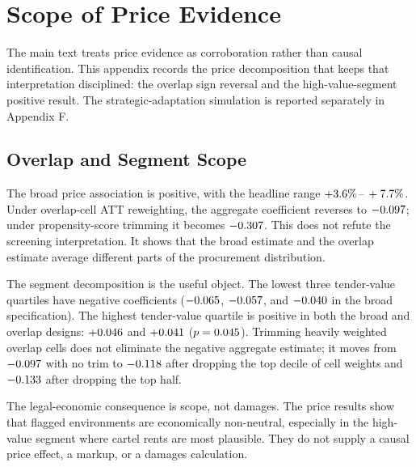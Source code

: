 \section{Scope of Price Evidence}
\label{app:scope_adaptation_submission}

The main text treats price evidence as corroboration rather
than causal identification. This appendix records the price
decomposition that keeps that interpretation disciplined: the
overlap sign reversal and the high-value-segment positive
result. The strategic-adaptation simulation is reported
separately in Appendix F.

\subsection{Overlap and Segment Scope}
\label{app:overlap_scope_submission}

The broad price association is positive, with the headline range
$+3.6\%\,\text{--}\,+7.7\%$. Under overlap-cell ATT reweighting, the
aggregate coefficient reverses to $-0.097$; under
propensity-score trimming it becomes $-0.307$. This
does not refute the screening interpretation. It shows that the
broad estimate and the overlap estimate average different parts
of the procurement distribution.

The segment decomposition is the useful object. The lowest three
tender-value quartiles have negative coefficients
($-0.065$, $-0.057$, and
$-0.040$ in the broad specification). The highest
tender-value quartile is positive in both the broad and overlap
designs: $+0.046$ and $+0.041$
($p=0.045$). Trimming heavily weighted overlap cells
does not eliminate the negative aggregate estimate; it moves from
$-0.097$ with no trim to $-0.118$ after dropping
the top decile of cell weights and $-0.133$ after
dropping the top half.

The legal-economic consequence is scope, not damages. The price
results show that flagged environments are economically
non-neutral, especially in the high-value segment where cartel
rents are most plausible. They do not supply a causal price
effect, a markup, or a damages calculation.
